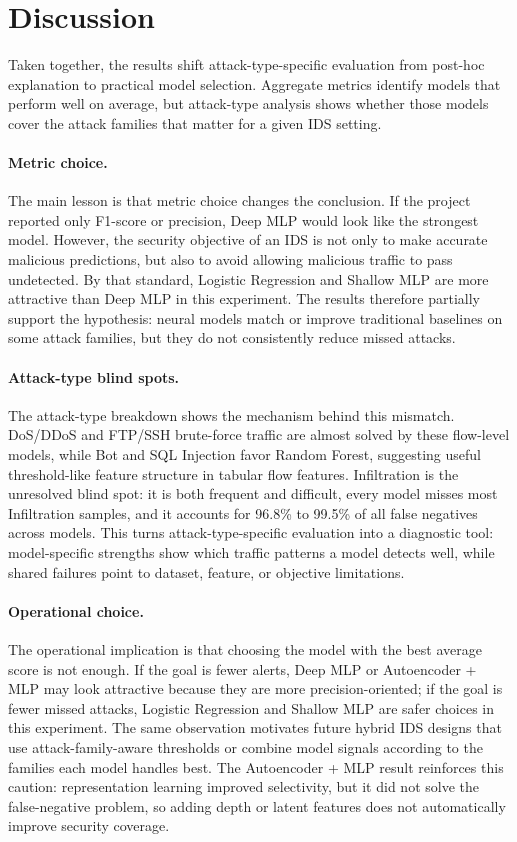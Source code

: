 \documentclass[sigconf,nonacm]{acmart}
\begin{document}
\section{Discussion}

Taken together, the results shift attack-type-specific evaluation from post-hoc explanation to practical model selection.
Aggregate metrics identify models that perform well on average, but attack-type analysis shows whether those models cover the attack families that matter for a given IDS setting.

\paragraph{Metric choice.}
The main lesson is that metric choice changes the conclusion.
If the project reported only F1-score or precision, Deep MLP would look like the strongest model.
However, the security objective of an IDS is not only to make accurate malicious predictions, but also to avoid allowing malicious traffic to pass undetected.
By that standard, Logistic Regression and Shallow MLP are more attractive than Deep MLP in this experiment.
The results therefore partially support the hypothesis: neural models match or improve traditional baselines on some attack families, but they do not consistently reduce missed attacks.

\paragraph{Attack-type blind spots.}
The attack-type breakdown shows the mechanism behind this mismatch.
DoS/DDoS and FTP/SSH brute-force traffic are almost solved by these flow-level models, while Bot and SQL Injection favor Random Forest, suggesting useful threshold-like feature structure in tabular flow features.
Infiltration is the unresolved blind spot: it is both frequent and difficult, every model misses most Infiltration samples, and it accounts for 96.8\% to 99.5\% of all false negatives across models.
This turns attack-type-specific evaluation into a diagnostic tool: model-specific strengths show which traffic patterns a model detects well, while shared failures point to dataset, feature, or objective limitations.

\paragraph{Operational choice.}
The operational implication is that choosing the model with the best average score is not enough.
If the goal is fewer alerts, Deep MLP or Autoencoder + MLP may look attractive because they are more precision-oriented; if the goal is fewer missed attacks, Logistic Regression and Shallow MLP are safer choices in this experiment.
The same observation motivates future hybrid IDS designs that use attack-family-aware thresholds or combine model signals according to the families each model handles best.
The Autoencoder + MLP result reinforces this caution: representation learning improved selectivity, but it did not solve the false-negative problem, so adding depth or latent features does not automatically improve security coverage.
\end{document}
